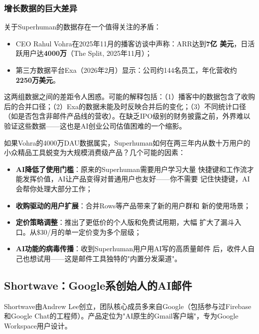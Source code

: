 \subsubsection{增长数据的巨大差异}
关于Superhuman的数据存在一个值得关注的矛盾：

\begin{itemize}
  \item CEO Rahul Vohra在2025年11月的播客访谈中声称：ARR达到\textbf{7亿
    美元}，日活跃用户达\textbf{4000万}（The Split, 2025年11月）；
  \item 第三方数据平台Exa（2026年2月）显示：公司约144名员工，年化营收约
    \textbf{2250万美元}。
\end{itemize}

这两组数据之间的差距令人困惑。可能的解释包括：（1）播客中的数据包含了收购
后的合并口径；（2）Exa的数据未能及时反映合并后的变化；（3）不同统计口径
（如是否包含非邮件产品线的营收）。在缺乏IPO级别的财务披露之前，外界难以
验证这些数据——这也是AI创业公司估值困难的一个缩影。

\begin{whybox}
如果Vohra的4000万DAU数据属实，Superhuman如何在两三年内从数十万用户的
小众精品工具蜕变为大规模消费级产品？几个可能的因素：
\begin{itemize}
  \item \textbf{AI降低了使用门槛}：原来的Superhuman需要用户学习大量
    快捷键和工作流才能发挥价值，AI让产品变得对普通用户也友好——你不需要
    记住快捷键，AI会帮你处理大部分工作；
  \item \textbf{收购驱动的用户扩展}：合并Rows等产品带来了新的用户群和
    新的使用场景；
  \item \textbf{定价策略调整}：推出了更低价的个人版和免费试用期，大幅
    扩大了漏斗入口。从\$30/月的单一定价变为多个层级；
  \item \textbf{AI功能的病毒传播}：收到Superhuman用户用AI写的高质量邮件
    后，收件人自己也想试用——这是邮件工具独特的"内置分发渠道"。
\end{itemize}
\end{whybox}

\subsection{Shortwave：Google系创始人的AI邮件}
\label{subsec:shortwave}

Shortwave由Andrew Lee创立，团队核心成员多来自Google（包括参与过Firebase
和Google Chat的工程师）。产品定位为"AI原生的Gmail客户端"，专为Google
Workspace用户设计。

